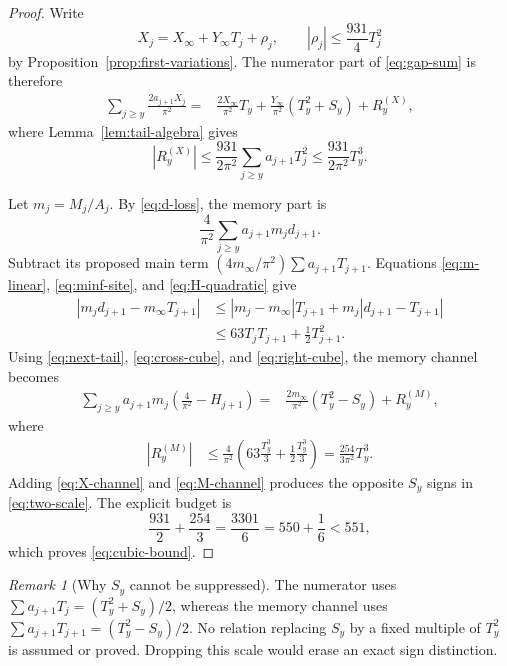 \documentclass[11pt]{article}
\theoremstyle{definition}
\theoremstyle{remark}
\newtheorem{remark}[theorem]{Remark}
\begin{document}
\begin{proof}
Write
\[
 X_j=X_\infty+Y_\infty T_j+\rho_j,\qquad
 |\rho_j|\le\frac{931}{4}T_j^2
\]
by Proposition~\ref{prop:first-variations}.  The numerator part of
\eqref{eq:gap-sum} is therefore
\begin{align}
\sum_{j\ge y}\frac{2a_{j+1}X_j}{\pi^2}
={}&\frac{2X_\infty}{\pi^2}T_y
 +\frac{Y_\infty}{\pi^2}(T_y^2+S_y)+R_y^{(X)},
 \label{eq:X-channel}
\end{align}
where Lemma~\ref{lem:tail-algebra} gives
\begin{equation}
 |R_y^{(X)}|
 \le\frac{931}{2\pi^2}\sum_{j\ge y}a_{j+1}T_j^2
 \le\frac{931}{2\pi^2}T_y^3.
 \label{eq:X-budget}
\end{equation}

Let $m_j=M_j/A_j$.  By \eqref{eq:d-loss}, the memory part is
\[
 \frac4{\pi^2}\sum_{j\ge y}a_{j+1}m_jd_{j+1}.
\]
Subtract its proposed main term
$(4m_\infty/\pi^2)\sum a_{j+1}T_{j+1}$.  Equations
\eqref{eq:m-linear}, \eqref{eq:minf-site}, and
\eqref{eq:H-quadratic} give
\begin{align*}
|m_jd_{j+1}-m_\infty T_{j+1}|
&\le |m_j-m_\infty|T_{j+1}
   +m_j|d_{j+1}-T_{j+1}|\\
&\le63T_jT_{j+1}+\tfrac12T_{j+1}^2.
\end{align*}
Using \eqref{eq:next-tail}, \eqref{eq:cross-cube}, and
\eqref{eq:right-cube}, the memory channel becomes
\begin{align}
\sum_{j\ge y}a_{j+1}m_j
\left(\frac4{\pi^2}-H_{j+1}\right)
={}&\frac{2m_\infty}{\pi^2}(T_y^2-S_y)+R_y^{(M)},
 \label{eq:M-channel}
\end{align}
where
\begin{align}
 |R_y^{(M)}|
 &\le\frac4{\pi^2}
 \left(63\frac{T_y^3}{3}+\frac12\frac{T_y^3}{3}\right)
 =\frac{254}{3\pi^2}T_y^3.
 \label{eq:M-budget}
\end{align}
Adding \eqref{eq:X-channel} and \eqref{eq:M-channel} produces the opposite
$S_y$ signs in \eqref{eq:two-scale}.  The explicit budget is
\[
 \frac{931}{2}+\frac{254}{3}=\frac{3301}{6}
 =550+\frac16<551,
\]
which proves \eqref{eq:cubic-bound}.
\end{proof}

\begin{remark}[Why $S_y$ cannot be suppressed]
The numerator uses $\sum a_{j+1}T_j=(T_y^2+S_y)/2$, whereas the memory
channel uses $\sum a_{j+1}T_{j+1}=(T_y^2-S_y)/2$.  No relation replacing
$S_y$ by a fixed multiple of $T_y^2$ is assumed or proved.  Dropping this
scale would erase an exact sign distinction.
\end{remark}
\end{document}
